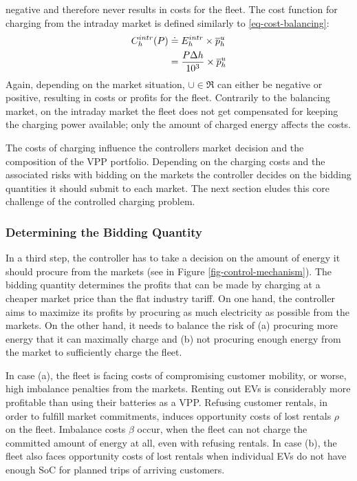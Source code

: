 \documentclass[a4paper, 12pt]{article}
\begin{document}
negative and therefore never results in costs for the fleet. The cost function
for charging from the intraday market is defined similarly to
\eqref{eq-cost-balancing}:
\begin{equation}
\begin{split}
    C^{intr}_{h}(P) &\doteq E^{intr}_{h} \times \overline p^u_{h} \\
    &= \frac{P\Delta h}{10^{3}}\times \overline p^u_{h}
\end{split}
\end{equation}
Again, depending on the market situation, \(\cup{}\!\in\!\Re\) can either be
negative or positive, resulting in costs or profits for the fleet. Contrarily to
the balancing market, on the intraday market the fleet does not get compensated
for keeping the charging power available; only the amount of charged energy affects the
costs.

The costs of charging influence the controllers market decision and the
composition of the VPP portfolio. Depending on the charging costs and the
associated risks with bidding on the markets the controller decides on the
bidding quantities it should submit to each market. The next section eludes this
core challenge of the controlled charging problem.

\subsubsection{Determining the Bidding Quantity}
\label{sec:org7f76200}
In a third step, the controller has to take a decision on the amount of energy
it should procure from the markets (see in Figure
\ref{fig-control-mechanism}). The bidding quantity determines the profits that can
be made by charging at a cheaper market price than the flat industry tariff. On
one hand, the controller aims to maximize its profits by procuring as much
electricity as possible from the markets. On the other hand, it needs to balance
the risk of (a) procuring more energy that it can maximally charge and (b) not
procuring enough energy from the market to sufficiently charge the fleet.

In case (a), the fleet is facing costs of compromising customer mobility, or
worse, high imbalance penalties from the markets. Renting out EVs is
considerably more profitable than using their batteries as a VPP. Refusing
customer rentals, in order to fulfill market commitments, induces opportunity
costs of lost rentals \(\rho\) on the fleet. Imbalance costs \(\beta\) occur, when
the fleet can not charge the committed amount of energy at all, even with refusing
rentals. In case (b), the fleet also faces opportunity costs of lost rentals
when individual EVs do not have enough SoC for planned trips of arriving
customers.
\end{document}
